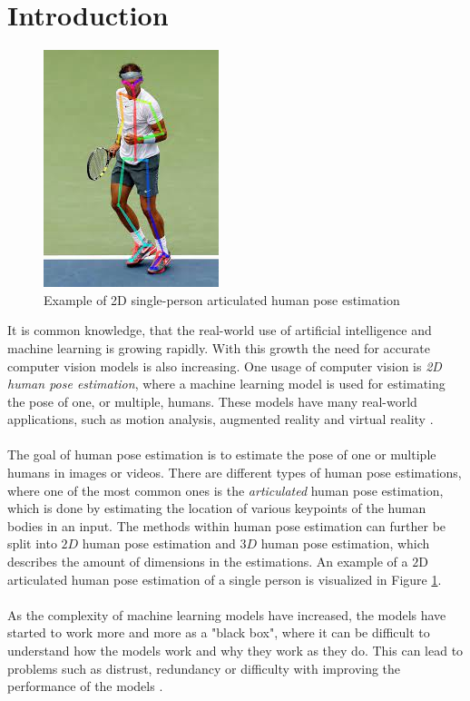 \documentclass[./main.tex]{subfiles}
\begin{document}
\section{Introduction}
\begin{figure}[htbp]
    \centering
    \includegraphics[height = 6 cm]{./entities/pose_estimation_example_img.jpg}
    \caption{Example of 2D single-person articulated human pose estimation \cite{pose_estimation_example}}
    \label{fig:pose_estimation_example_fig}
\end{figure}
\noindent It is common knowledge, that the real-world use of artificial intelligence and machine learning is growing rapidly. With this growth the need for accurate computer vision models is also increasing. One usage of computer vision is \textit{2D human pose estimation}, where a machine learning model is used for estimating the pose of one, or multiple, humans. These models have many real-world applications, such as motion analysis, augmented reality and virtual reality \cite{survey_2}.
\\
\\
The goal of human pose estimation is to estimate the pose of one or multiple humans in images or videos. There are different types of human pose estimations, where one of the most common ones is the \textit{articulated} human pose estimation, which is done by estimating the location of various keypoints of the human bodies in an input. The methods within human pose estimation can further be split into $2D$ human pose estimation and $3D$ human pose estimation, which describes the amount of dimensions in the estimations. An example of a $2$D articulated human pose estimation of a single person is visualized in Figure \ref{fig:pose_estimation_example_fig}.
\\
\\
As the complexity of machine learning models have increased, the models have started to work more and more as a "black box", where it can be difficult to understand how the models work and why they work as they do. This can lead to problems such as distrust, redundancy or difficulty with improving the performance of the models \cite{Selvaraju}.
\end{document}
